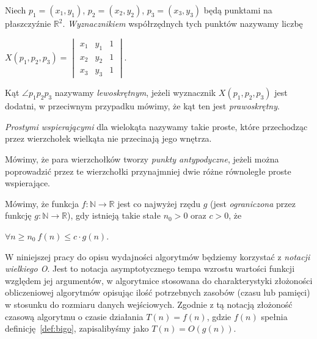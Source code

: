\begin{definicja}
  Niech $p_{1}=(x_{1},y_{1})$, $p_{2}=(x_{2},y_{2})$,
  $p_{3}=(x_{3},y_{3})$ będą punktami na płaszczyźnie
  $\mathbb{R}^2$. \emph{Wyznacznikiem} współrzędnych tych punktów
  nazywamy liczbę

  \begin{center}
    \begin{math}
      X(p_1, p_2, p_3) =
      \begin{vmatrix}
        x_1 & y_1 & 1 \\
        x_2 & y_2 & 1 \\
        x_3 & y_3 & 1
      \end{vmatrix}
      .
    \end{math}
  \end{center}

  Kąt $\angle p_{1}p_{2}p_{3}$ nazywamy \emph{lewoskrętnym}, jeżeli
  wyznacznik $X(p_1, p_2, p_3)$ jest dodatni, w przeciwnym przypadku
  mówimy, że kąt ten jest \emph{prawoskrętny}.
\end{definicja}

\begin{definicja}
  \emph{Prostymi wspierającymi} dla wielokąta nazywamy takie proste,
  które przechodząc przez wierzchołek wielkąta nie przecinają jego
  wnętrza.
\end{definicja}

\begin{definicja}
  Mówimy, że para wierzchołków tworzy \emph{punkty antypodyczne},
  jeżeli można poprowadzić przez te wierzchołki przynajmniej dwie
  różne równoległe proste wspierające.
\end{definicja}

\begin{definicja}\label{def:bigo}
  Mówimy, że funkcja $f\colon \mathbb{N} \to \mathbb{R}$ jest co
  najwyżej rzędu $g$ (jest \emph{ograniczona} przez funkcję $g\colon
  \mathbb{N} \to \mathbb{R}$), gdy istnieją takie stałe $n_0 > 0$ oraz
  $c > 0$, że

  \begin{center}
    $\forall n \geq n_0\ f(n) \leq c \cdot g(n)$.
  \end{center}
\end{definicja}

W niniejszej pracy do opisu wydajności algorytmów będziemy korzystać z
\emph{notacji wielkiego O}. Jest to notacja asymptotycznego tempa
wzrostu wartości funkcji względem jej argumentów, w algorytmice
stosowana do charakterystyki złożoności obliczeniowej algorytmów
opisując ilość potrzebnych zasobów (czasu lub pamięci) w stosunku do
rozmiaru danych wejściowych. Zgodnie z tą notacją złożoność czasową
algorytmu o czasie działania $T(n) = f(n)$, gdzie $f(n)$ spełnia
definicję~\ref{def:bigo}, zapisalibyśmy jako $T(n) = O(g(n))$.

